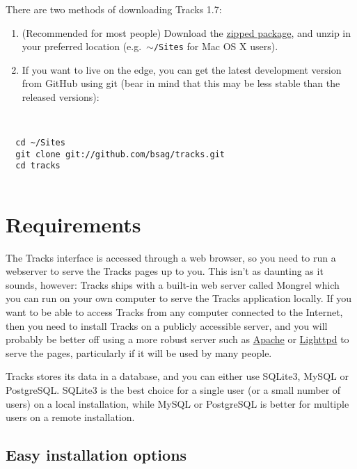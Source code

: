 \documentclass[10pt,twoside]{memoir}
\begin{document}
There are two methods of downloading Tracks 1.7:


\begin{enumerate}


\item (Recommended for most people) Download the \href{http://www.rousette.org.uk/projects/files/tracks-current.zip}{zipped package}, and unzip in your preferred location (e.g.\ \texttt{\ensuremath{\sim}/Sites} for Mac OS X users).

\item If you want to live on the edge, you can get the latest development version from GitHub using git (bear in mind that this may be less stable than the released versions):
\end{enumerate}

\begin{adjustwidth}{2.5em}{2.5em}
\begin{verbatim}


  cd ~/Sites
  git clone git://github.com/bsag/tracks.git
  cd tracks


\end{verbatim}
\end{adjustwidth}

\section{Requirements}
\label{requirements}

The Tracks interface is accessed through a web browser, so you need to run a webserver to serve the Tracks pages up to you. This isn't as daunting as it sounds, however: Tracks ships with a built-in web server called Mongrel which you can run on your own computer to serve the Tracks application locally. If you want to be able to access Tracks from any computer connected to the Internet, then you need to install Tracks on a publicly accessible server, and you will probably be better off using a more robust server such as \href{http://www.apache.org/}{Apache} or \href{http://www.lighttpd.net/}{Lighttpd} to serve the pages, particularly if it will be used by many people.


Tracks stores its data in a database, and you can either use SQLite3, MySQL or PostgreSQL. SQLite3 is the best choice for a single user (or a small number of users) on a local installation, while MySQL or PostgreSQL is better for multiple users on a remote installation.


\subsection{Easy installation options}
\label{easyinstallationoptions}
\end{document}
